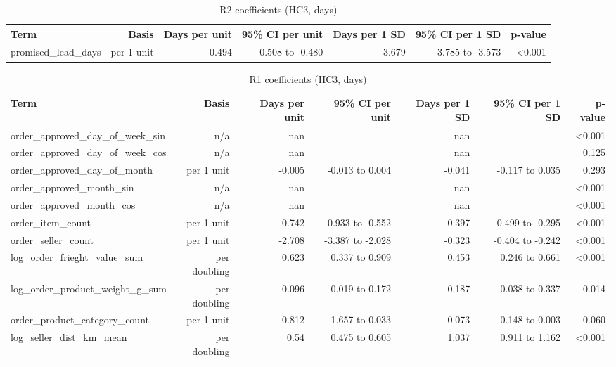 \begin{table}[htbp]
\centering
\small
\caption{R2 coefficients (HC3, days)}
\begin{tabular}{lrrrrrr}
\toprule
Term & Basis & Days per unit & 95\% CI per unit & Days per 1 SD & 95\% CI per 1 SD & p-value \\
\midrule
promised\_lead\_days & per 1 unit & -0.494 & -0.508 to -0.480 & -3.679 & -3.785 to -3.573 & <0.001 \\
\bottomrule
\end{tabular}
\par\smallskip\begin{minipage}{\linewidth}\footnotesize \end{minipage}
\end{table}


\begin{table}[htbp]
\centering
\small
\caption{R1 coefficients (HC3, days)}
\begin{tabular}{lrrrrrr}
\toprule
Term & Basis & Days per unit & 95\% CI per unit & Days per 1 SD & 95\% CI per 1 SD & p-value \\
\midrule
order\_approved\_day\_of\_week\_sin & n/a & nan &  & nan &  & <0.001 \\
order\_approved\_day\_of\_week\_cos & n/a & nan &  & nan &  & 0.125 \\
order\_approved\_day\_of\_month & per 1 unit & -0.005 & -0.013 to 0.004 & -0.041 & -0.117 to 0.035 & 0.293 \\
order\_approved\_month\_sin & n/a & nan &  & nan &  & <0.001 \\
order\_approved\_month\_cos & n/a & nan &  & nan &  & <0.001 \\
order\_item\_count & per 1 unit & -0.742 & -0.933 to -0.552 & -0.397 & -0.499 to -0.295 & <0.001 \\
order\_seller\_count & per 1 unit & -2.708 & -3.387 to -2.028 & -0.323 & -0.404 to -0.242 & <0.001 \\
log\_order\_frieght\_value\_sum & per doubling & 0.623 & 0.337 to 0.909 & 0.453 & 0.246 to 0.661 & <0.001 \\
log\_order\_product\_weight\_g\_sum & per doubling & 0.096 & 0.019 to 0.172 & 0.187 & 0.038 to 0.337 & 0.014 \\
order\_product\_category\_count & per 1 unit & -0.812 & -1.657 to 0.033 & -0.073 & -0.148 to 0.003 & 0.060 \\
log\_seller\_dist\_km\_mean & per doubling & 0.54 & 0.475 to 0.605 & 1.037 & 0.911 to 1.162 & <0.001 \\

\end{tabular}
\end{table}
